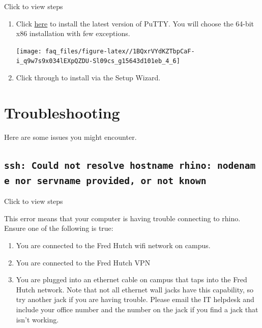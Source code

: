 \documentclass[
]{book}
\providecommand{\tightlist}{%
  \setlength{\itemsep}{0pt}\setlength{\parskip}{0pt}}
\begin{document}
Click to view steps

\begin{enumerate}
\def\labelenumi{\arabic{enumi}.}
\item
  Click \href{https://www.chiark.greenend.org.uk/~sgtatham/putty/latest.html}{here} to install the latest version of PuTTY. You will choose the 64-bit x86 installation with few exceptions.

  \texttt{[image: faq\_files/figure-latex//1BQxrVYdKZTbpCaF-i\_q9w7s9x034lEXpQZDU-Sl09cs\_g15643d101eb\_4\_6]}
\item
  Click through to install via the Setup Wizard.
\end{enumerate}

\hypertarget{troubleshooting}{%
\section{Troubleshooting}\label{troubleshooting}}

Here are some issues you might encounter.

\hypertarget{ssh-could-not-resolve-hostname-rhino-nodename-nor-servname-provided-or-not-known}{%
\subsection*{\texorpdfstring{\texttt{ssh:\ Could\ not\ resolve\ hostname\ rhino:\ nodename\ nor\ servname\ provided,\ or\ not\ known}}{ssh: Could not resolve hostname rhino: nodename nor servname provided, or not known}}\label{ssh-could-not-resolve-hostname-rhino-nodename-nor-servname-provided-or-not-known}}

Click to view steps

This error means that your computer is having trouble connecting to rhino. Ensure one of the following is true:

\begin{enumerate}
\def\labelenumi{\arabic{enumi}.}
\tightlist
\item
  You are connected to the Fred Hutch wifi network on campus.
\item
  You are connected to the Fred Hutch VPN
\item
  You are plugged into an ethernet cable on campus that taps into the Fred Hutch network. Note that not all ethernet wall jacks have this capability, so try another jack if you are having trouble. Please email the IT helpdesk and include your office number and the number on the jack if you find a jack that isn't working.
\end{enumerate}
\end{document}
